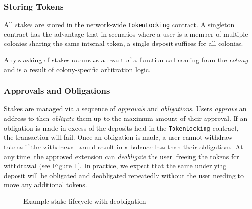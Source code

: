 \subsubsection{Storing Tokens}

All stakes are stored in the network-wide \texttt{TokenLocking} contract. A singleton contract has the advantage that in scenarios where a user is a member of multiple colonies sharing the same internal token, a single deposit suffices for all colonies.

Any slashing of stakes occurs as a result of a function call coming from the \textit{colony} and is a result of colony-specific arbitration logic.

\subsubsection{Approvals and Obligations}

Stakes are managed via a sequence of \textit{approvals} and \textit{obligations}. Users \textit{approve} an address to then \textit{obligate} them up to the maximum amount of their approval. If an obligation is made in excess of the deposits held in the \texttt{TokenLocking} contract, the transaction will fail. Once an obligation is made, a user cannot withdraw tokens if the withdrawal would result in a balance less than their obligations. At any time, the approved extension can \textit{deobligate} the user, freeing the tokens for withdrawal (see Figure \ref{fig:stake-deobligate}). In practice, we expect that the same underlying deposit will be obligated and deobligated repeatedly without the user needing to move any additional tokens.

\begin{figure}[h]
    \centering
{}
 \caption{Example stake lifecycle with deobligation}
 \label{fig:stake-deobligate}
\end{figure}

